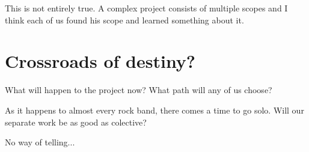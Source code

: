 \documentclass[12pt,a4paper]{article}
\begin{document}
		This is not entirely true. A complex project consists of multiple scopes and I think each of us found his scope and learned something about it.

	
	\section*{Crossroads of destiny?}
                What will happen to the project now? What path will any of us choose?


                As it happens to almost every rock band, there comes a time to go solo. Will our separate work be as good as colective?


                No way of telling...
	
\end{document}
